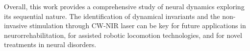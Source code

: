 Overall, this work provides a comprehensive study of neural dynamics exploring its sequential nature. The identification of dynamical invariants and the non-invasive stimulation through CW-NIR laser can be key for future applications in neurorrehabilitation, for assisted robotic locomotion technologies,  and for novel treatments in neural disorders.